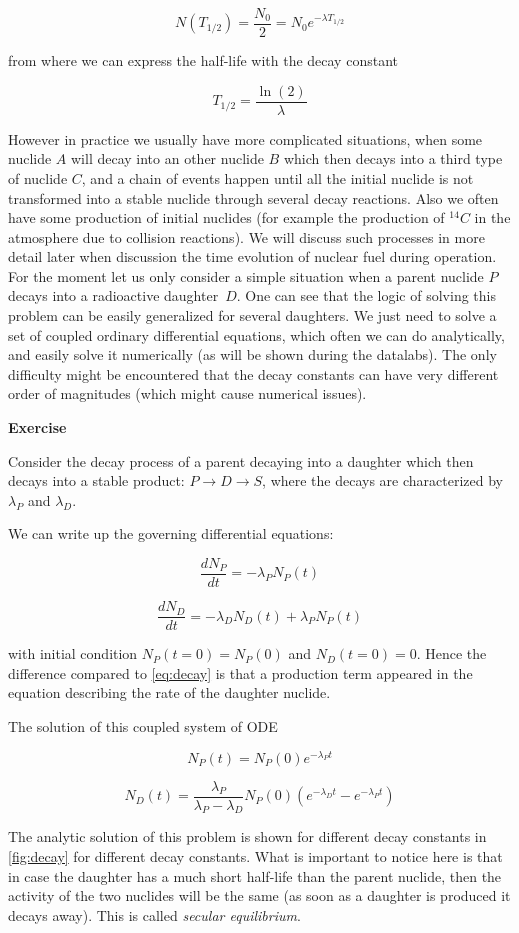 \begin{equation}
N(T_{1/2})=\frac{N_0}{2}=N_0e^{-\lambda T_{1/2}}
\end{equation}

from where we can express the half-life with the decay constant

\begin{equation}
T_{1/2}=\frac{\ln(2)}{\lambda}
\end{equation}

However in practice we usually have more complicated situations, when some nuclide $A$ will decay into an other nuclide $B$ which then decays into a third type of nuclide $C$, and a chain of events happen until all the initial nuclide is not transformed into a stable nuclide through several decay reactions. Also we often have some production of initial nuclides (for example the production of ${}^{14}C$ in the atmosphere due to collision reactions). We will discuss such processes in more detail later when discussion the time evolution of nuclear fuel during operation. For the moment let us only consider a simple situation when a parent nuclide $P$ decays into a radioactive daughter~$D$. One can see that the logic of solving this problem can be easily generalized for several daughters. We just need to solve a set of coupled ordinary differential equations, which often we can do analytically, and easily solve it numerically (as will be shown during the datalabs). The only difficulty might be encountered that the decay constants can have very different order of magnitudes (which might cause numerical issues).

\begin{tcolorbox}
\textbf{Exercise}

Consider the decay process of a parent decaying into a daughter which then decays into a stable product: $P\rightarrow D \rightarrow S$, where the decays are characterized by $\lambda_P$ and $\lambda_D$.

We can write up the governing differential equations:

$$\frac{dN_P}{dt}=-\lambda_P N_P(t)$$

$$\frac{dN_D}{dt}=-\lambda_D N_D(t) + \lambda_P N_P(t)$$

\noindent with initial condition $N_P(t=0)=N_P(0)$ and $N_D(t=0)=0$. Hence the difference compared to \eqref{eq:decay} is that a production term appeared in the equation describing the rate of the daughter nuclide.

The solution of this coupled system of ODE

$$ N_{P} (t) = N_P(0)e^{-\lambda_{P}t}$$

$$ N_{D} (t) = \frac{\lambda_P}{\lambda_P - \lambda_{D}}N_P(0)(e^{-\lambda_{D}t} - e^{-\lambda_{P}t}) $$

The analytic solution of this problem is shown for different decay constants in \autoref{fig:decay} for different decay constants. What is important to notice here is that in case the daughter has a much short half-life than the parent nuclide, then the activity of the two nuclides will be the same (as soon as a daughter is produced it decays away). This is called \textit{secular equilibrium}.
\end{tcolorbox}

